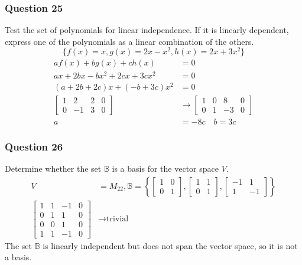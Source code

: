 \documentclass{math}
\begin{document}
\subsubsection*{Question 25}
Test the set of polynomials for linear independence. If it is linearly
dependent, express one of the polynomials as a linear combination of the
others.
\[ \{f(x) = x, g(x) = 2x-x^2, h(x) = 2x+3x^2\} \]
\begin{align*}
  af(x)+bg(x)+ch(x) &= 0 \\
  ax+2bx-bx^2+2cx+3cx^2 &= 0 \\
  (a+2b+2c)x+(-b+3c)x^2 &= 0 \\
  \left[\begin{array}{ccc|c}
    1 & 2 & 2 & 0 \\
    0 & -1 & 3 & 0
  \end{array}\right] &\to \left[\begin{array}{ccc|c}
    1 & 0 & 8 & 0 \\
    0 & 1 & -3 & 0
  \end{array}\right] \\
  a &= -8c \quad b = 3c
\end{align*}

\subsubsection*{Question 26}
Determine whether the set \( \mathbb{B} \) is a basis for the vector space
\( V \).
\begin{align*}
  V &= M_{22}, \mathbb{B} = \left\{
    \begin{bmatrix}1 & 0 \\ 0 & 1\end{bmatrix},
    \begin{bmatrix}1 & 1 \\ 0 & 1\end{bmatrix},
    \begin{bmatrix}-1 & 1 \\ 1 & -1\end{bmatrix}
  \right\} \\
  \left[\begin{array}{ccc|c}
    1 & 1 & -1 & 0 \\
    0 & 1 & 1 & 0 \\
    0 & 0 & 1 & 0 \\
    1 & 1 & -1 & 0
  \end{array}\right] &\to \text{trivial}
\end{align*}
The set \( \mathbb{B} \) is linearly independent but does not span the vector
space, so it is not a basis.
\end{document}
